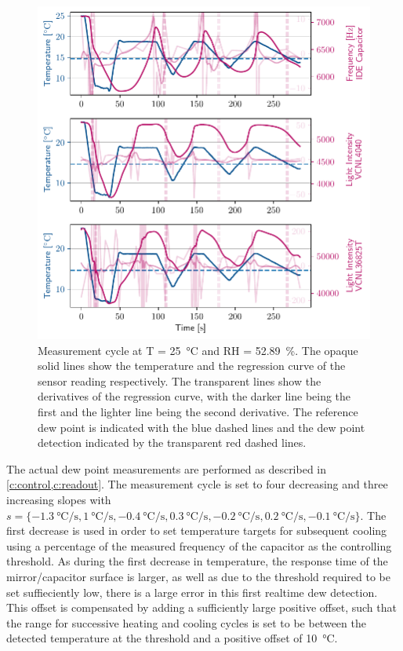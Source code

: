 \begin{figure}[h!]
    \centering
    \includegraphics{graphs/measurementT25RH50.pdf}
    \caption{Measurement cycle at T = \qty{25}{\celsius} and RH = \qty{52.89}{\percent}. The opaque solid lines show the temperature and the regression curve of the sensor reading respectively. The transparent lines show the derivatives of the regression curve, with the darker line being the first and the lighter line being the second derivative. The reference dew point is indicated with the blue dashed lines and the dew point detection indicated by the transparent red dashed lines.}
    \label{g:meas_cycle}
\end{figure}
The actual dew point measurements are performed as described in \cref{c:control,c:readout}. The measurement cycle is set to four decreasing and three increasing slopes with $s = \{ \qty[per-mode=fraction]{-1.3}{\celsius\per\s}, \qty[per-mode=fraction, retain-explicit-plus]{+1}{\celsius\per\s}, \qty[per-mode=fraction]{-0.4}{\celsius\per\s}, \qty[per-mode=fraction, retain-explicit-plus]{+0.3}{\celsius\per\s},\qty[per-mode=fraction]{-0.2}{\celsius\per\s}, \qty[per-mode=fraction, retain-explicit-plus]{+0.2}{\celsius\per\s},\qty[per-mode=fraction]{-0.1}{\celsius\per\s} \}$. The first decrease is used in order to set temperature targets for subsequent cooling using a percentage of the measured frequency of the capacitor as the controlling threshold. As during the first decrease in temperature, the response time of the mirror/capacitor surface is larger, as well as due to the threshold required to be set suffieciently low, there is a large error in this first realtime dew detection. This offset is compensated by adding a sufficiently large positive offset, such that the range for successive heating and cooling cycles is set to be between the detected temperature at the threshold and a positive offset of \qty{10}{\celsius}. 

